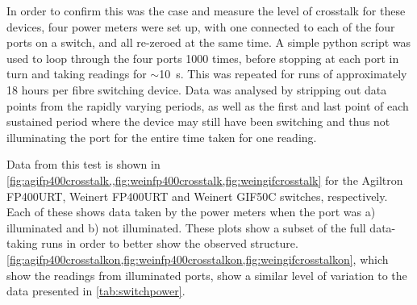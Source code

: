 \documentclass[a4paper,11pt]{article}
\let\oldsim\sim
\renewcommand{\sim}{{\oldsim}}
\begin{document}
In order to confirm this was the case and measure the level of crosstalk for these devices, four power meters were set up, with one connected to each of the four ports on a switch, and all re-zeroed at the same time. A simple python script was used to loop through the four ports 1000 times, before stopping at each port in turn and taking readings for $\sim$10~s. This was repeated for runs of approximately 18 hours per fibre switching device. Data was analysed by stripping out data points from the rapidly varying periods, as well as the first and last point of each sustained period where the device may still have been switching and thus not illuminating the port for the entire time taken for one reading.

Data from this test is shown in \cref{fig:agifp400crosstalk,,fig:weinfp400crosstalk,fig:weingifcrosstalk} for the Agiltron FP400URT, Weinert FP400URT and Weinert GIF50C switches, respectively. Each of these shows data taken by the power meters when the port was a) illuminated and b) not illuminated. These plots show a subset of the full data-taking runs in order to better show the observed structure. \cref{fig:agifp400crosstalkon,fig:weinfp400crosstalkon,fig:weingifcrosstalkon}, which show the readings from illuminated ports, show a similar level of variation to the data presented in \cref{tab:switchpower}.
\end{document}
